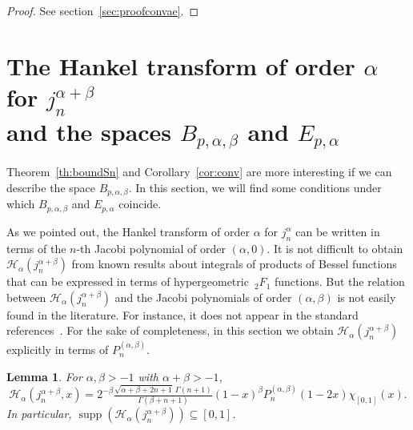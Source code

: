 \documentclass[reqno]{amsart}
\theoremstyle{plain}
\newtheorem{Lem}{Lemma}
\theoremstyle{definition}
\theoremstyle{remark}
\newcommand{\supp}{\operatorname{supp}} %
\newcommand{\htr}{\mathcal{H}_\alpha} %
\newcommand{\hf}{{\,{}_2F_1}} %
\begin{document}
\begin{proof}
See section~\ref{sec:proofconvae}.
\end{proof}


\section{The Hankel transform of order $\alpha$ for $j_n^{\alpha+\beta}$\\
and the spaces $B_{p,\alpha,\beta}$ and $E_{p,\alpha}$}
\label{sec:Bpab=Epa}

Theorem~\ref{th:boundSn} and Corollary~\ref{cor:conv} are more interesting if
we can describe the space $B_{p,\alpha,\beta}$. In this section, we will find
some conditions under which $B_{p,\alpha,\beta}$ and $E_{p,\alpha}$ coincide.

As we pointed out, the Hankel transform of order $\alpha$ for $j_n^\alpha$ can
be written in terms of the $n$-th Jacobi polynomial of order $(\alpha,0)$. It
is not difficult to obtain $\htr(j_n^{\alpha+\beta})$ from known results about
integrals of products of Bessel functions that can be expressed in terms of
hypergeometric $\hf$ functions. But the relation between
$\htr(j_n^{\alpha+\beta})$ and the Jacobi polynomials of order
$(\alpha,\beta)$ is not easily found in the literature. For instance, it does
not appear in the standard references~\cite{E-HTF,Wat, E-TIT}. For the sake of
completeness, in this section we obtain $\htr(j_n^{\alpha+\beta})$ explicitly
in terms of $P_n^{(\alpha,\beta)}$.

\begin{Lem}
\label{lem:HTjnab}
For $\alpha,\beta>-1$ with $\alpha + \beta > -1$,
\begin{equation*}
    \htr(j_n^{\alpha+\beta},x)
      = 2^{-\beta} \tfrac{\sqrt{\alpha+\beta+2n+1} \, \Gamma(n+1)}
        {\Gamma(\beta+n+1)}
        (1-x)^\beta P^{(\alpha,\beta)}_n(1-2x) \chi_{[0,1]}(x).
\end{equation*}
In particular,
$\supp (\htr(j^{\alpha+\beta}_n)) \subseteq [0,1]$.
\end{Lem}
\end{document}
